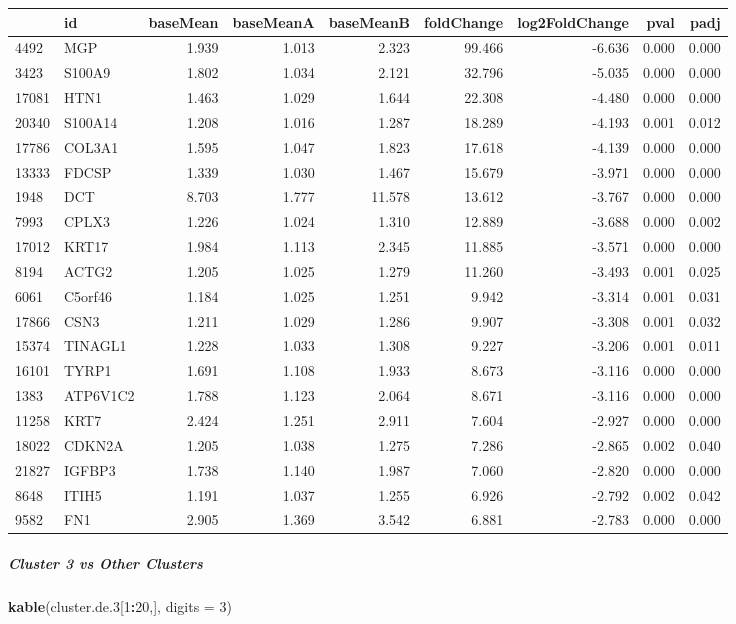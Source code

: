 \documentclass[]{article}
\newenvironment{Shaded}{\begin{snugshade}}{\end{snugshade}}
\newcommand{\DataTypeTok}[1]{\textcolor[rgb]{0.13,0.29,0.53}{#1}}
\newcommand{\DecValTok}[1]{\textcolor[rgb]{0.00,0.00,0.81}{#1}}
\newcommand{\FloatTok}[1]{\textcolor[rgb]{0.00,0.00,0.81}{#1}}
\newcommand{\KeywordTok}[1]{\textcolor[rgb]{0.13,0.29,0.53}{\textbf{#1}}}
\newcommand{\NormalTok}[1]{#1}
\newcommand{\OperatorTok}[1]{\textcolor[rgb]{0.81,0.36,0.00}{\textbf{#1}}}
\let\oldsubparagraph\subparagraph
\renewcommand{\subparagraph}[1]{\oldsubparagraph{#1}\mbox{}}
\begin{document}
\begin{longtable}[]{@{}llrrrrrrr@{}}
\toprule
& id & baseMean & baseMeanA & baseMeanB & foldChange & log2FoldChange &
pval & padj\tabularnewline
\midrule
\endhead
4492 & MGP & 1.939 & 1.013 & 2.323 & 99.466 & -6.636 & 0.000 &
0.000\tabularnewline
3423 & S100A9 & 1.802 & 1.034 & 2.121 & 32.796 & -5.035 & 0.000 &
0.000\tabularnewline
17081 & HTN1 & 1.463 & 1.029 & 1.644 & 22.308 & -4.480 & 0.000 &
0.000\tabularnewline
20340 & S100A14 & 1.208 & 1.016 & 1.287 & 18.289 & -4.193 & 0.001 &
0.012\tabularnewline
17786 & COL3A1 & 1.595 & 1.047 & 1.823 & 17.618 & -4.139 & 0.000 &
0.000\tabularnewline
13333 & FDCSP & 1.339 & 1.030 & 1.467 & 15.679 & -3.971 & 0.000 &
0.000\tabularnewline
1948 & DCT & 8.703 & 1.777 & 11.578 & 13.612 & -3.767 & 0.000 &
0.000\tabularnewline
7993 & CPLX3 & 1.226 & 1.024 & 1.310 & 12.889 & -3.688 & 0.000 &
0.002\tabularnewline
17012 & KRT17 & 1.984 & 1.113 & 2.345 & 11.885 & -3.571 & 0.000 &
0.000\tabularnewline
8194 & ACTG2 & 1.205 & 1.025 & 1.279 & 11.260 & -3.493 & 0.001 &
0.025\tabularnewline
6061 & C5orf46 & 1.184 & 1.025 & 1.251 & 9.942 & -3.314 & 0.001 &
0.031\tabularnewline
17866 & CSN3 & 1.211 & 1.029 & 1.286 & 9.907 & -3.308 & 0.001 &
0.032\tabularnewline
15374 & TINAGL1 & 1.228 & 1.033 & 1.308 & 9.227 & -3.206 & 0.001 &
0.011\tabularnewline
16101 & TYRP1 & 1.691 & 1.108 & 1.933 & 8.673 & -3.116 & 0.000 &
0.000\tabularnewline
1383 & ATP6V1C2 & 1.788 & 1.123 & 2.064 & 8.671 & -3.116 & 0.000 &
0.000\tabularnewline
11258 & KRT7 & 2.424 & 1.251 & 2.911 & 7.604 & -2.927 & 0.000 &
0.000\tabularnewline
18022 & CDKN2A & 1.205 & 1.038 & 1.275 & 7.286 & -2.865 & 0.002 &
0.040\tabularnewline
21827 & IGFBP3 & 1.738 & 1.140 & 1.987 & 7.060 & -2.820 & 0.000 &
0.000\tabularnewline
8648 & ITIH5 & 1.191 & 1.037 & 1.255 & 6.926 & -2.792 & 0.002 &
0.042\tabularnewline
9582 & FN1 & 2.905 & 1.369 & 3.542 & 6.881 & -2.783 & 0.000 &
0.000\tabularnewline
\bottomrule
\end{longtable}

\hypertarget{cluster-3-vs-other-clusters}{%
\subparagraph{Cluster 3 vs Other
Clusters}\label{cluster-3-vs-other-clusters}}

\begin{Shaded}
\begin{Highlighting}[]
\KeywordTok{kable}\NormalTok{(cluster.de}\FloatTok{.3}\NormalTok{[}\DecValTok{1}\OperatorTok{:}\DecValTok{20}\NormalTok{,], }\DataTypeTok{digits =} \DecValTok{3}\NormalTok{)}
\end{Highlighting}
\end{Shaded}
\end{document}

